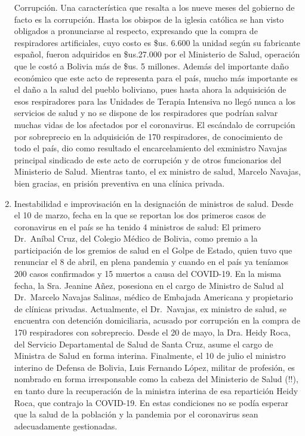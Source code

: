 \documentclass[a4paper, nobind]{templates/ociamthesis}
\begin{document}
\begin{enumerate}
  Corrupción. Una característica que resalta a los nueve meses del gobierno de facto es la corrupción. Hasta los obispos de la iglesia católica se han visto obligados a pronunciarse al respecto, expresando que la compra de respiradores artificiales, cuyo costo es \$us. 6.600 la unidad según su fabricante español, fueron adquiridos en \$us.27.000 por el Ministerio de Salud, operación que le costó a Bolivia más de \$us. 5 millones. Además del importante daño económico que este acto de representa para el país, mucho más importante es el daño a la salud del pueblo boliviano, pues hasta ahora la adquisición de esos respiradores para las Unidades de Terapia Intensiva no llegó nunca a los servicios de salud y no se dispone de los respiradores que podrían salvar muchas vidas de los afectados por el coronavirus. El escándalo de corrupción por sobreprecio en la adquisición de 170 respiradores, de conocimiento de todo el país, dio como resultado el encarcelamiento del exministro Navajas principal sindicado de este acto de corrupción y de otros funcionarios del Ministerio de Salud. Mientras tanto, el ex ministro de salud, Marcelo Navajas, bien gracias, en prisión preventiva en una clínica privada.
\item
  Inestabilidad e improvisación en la designación de ministros de salud. Desde el 10 de marzo, fecha en la que se reportan los dos primeros casos de coronavirus en el país se ha tenido 4 ministros de salud: El primero Dr.~Aníbal Cruz, del Colegio Médico de Bolivia, como premio a la participación de los gremios de salud en el Golpe de Estado, quien tuvo que renunciar el 8 de abril, en plena pandemia y cuando en el país ya teníamos 200 casos confirmados y 15 muertos a causa del COVID-19. En la misma fecha, la Sra. Jeanine Añez, posesiona en el cargo de Ministro de Salud al Dr.~Marcelo Navajas Salinas, médico de Embajada Americana y propietario de clínicas privadas. Actualmente, el Dr.~Navajas, ex ministro de salud, se encuentra con detención domiciliaria, acusado por corrupción en la compra de 170 respiradores con sobreprecio. Desde el 20 de mayo, la Dra. Heidy Roca, del Servicio Departamental de Salud de Santa Cruz, asume el cargo de Ministra de Salud en forma interina. Finalmente, el 10 de julio el ministro interino de Defensa de Bolivia, Luis Fernando López, militar de profesión, es nombrado en forma irresponsable como la cabeza del Ministerio de Salud (!!), en tanto dure la recuperación de la ministra interina de esa repartición Heidy Roca, que contrajo la COVID-19. En estas condiciones no se podía esperar que la salud de la población y la pandemia por el coronavirus sean adecuadamente gestionadas.

\end{enumerate}
\end{document}
